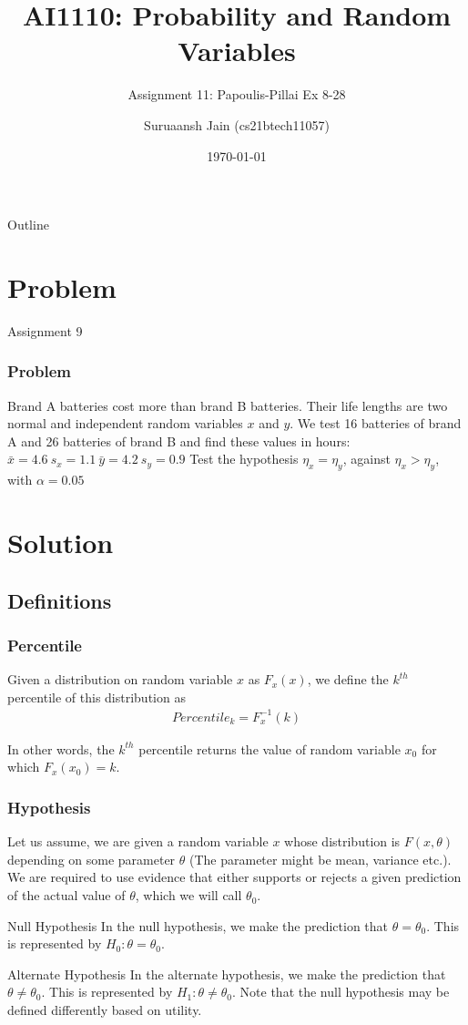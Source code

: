 \documentclass{beamer}
\title{AI1110: Probability and Random Variables}
\subtitle{Assignment 11: Papoulis-Pillai Ex 8-28}
\author{Suruaansh Jain (cs21btech11057)}
\date{\today}
\begin{document}
\begin{frame}
	\titlepage 
\end{frame}

\begin{frame}{Outline}
	\tableofcontents
\end{frame}

\section{Problem}

\begin{frame}{Assignment 9}
	\frametitle{Problem}
	Brand A batteries cost more than brand B batteries. Their life lengths are two normal and
independent random variables $x$ and $y$. We test 16 batteries of brand A and 26 batteries of brand B and find these values in hours:
$\bar x =4.6\ s_x = 1.1\ \bar y =4.2\ s_y =0.9$
Test the hypothesis $\eta _x = \eta _y$, against $\eta _x > \eta _y$, with $\alpha = 0.05$
\end{frame}

\section{Solution}

\subsection{Definitions}
\begin{frame}
	\frametitle{Percentile}
	Given a distribution on random variable $x$ as $F_x(x)$, we define the $k^{th}$ percentile of this distribution as
	\begin{align}
		Percentile_k = F_x^{-1}(k)
		\label{eq:Percentile}
	\end{align}

	In other words, the $k^{th}$ percentile returns the value of random variable $x_0$ for which $F_x(x_0) = k$.
\end{frame}

\begin{frame}
	\frametitle{Hypothesis}
	Let us assume, we are given a random variable $x$ whose distribution is $F(x, \theta)$ depending on some parameter $\theta$ (The parameter might be mean, variance etc.). We are required to use evidence that either supports or rejects a given prediction of the actual value of $\theta$, which we will call $\theta_0$.
	
	\begin{block}{Null Hypothesis}
		In the null hypothesis, we make the prediction that $\theta = \theta_0$. This is represented by $H_0 : \theta = \theta_0$.
	\end{block}
	
	\begin{block}{Alternate Hypothesis}
		In the alternate hypothesis, we make the prediction that $\theta \neq \theta_0$. This is represented by $H_1 : \theta \neq \theta_0$. Note that the null hypothesis may be defined differently based on utility.
	\end{block}	

\end{frame}
\end{document}
